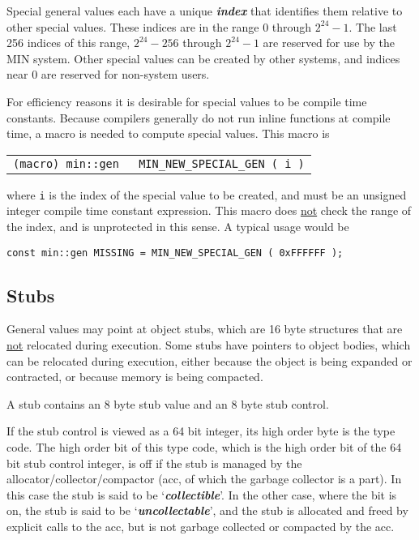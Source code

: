 \documentclass[12pt]{article}
\makeatletter
\newcommand{\key}[1]{{\bf \em #1}\index{#1}}
\newcommand{\ikey}[2]{{\bf \em #1}\index{#2}}
\newcommand{\ttnbkey}[1]{{\tt #1}\index{#1@{\tt #1}}}
\newenvironment{indpar}[1][0.3in]%
	{\begin{list}{}%
		     {\setlength{\itemsep}{0in}%
		      \setlength{\topsep}{0in}%
		      \setlength{\parsep}{1ex}%
		      \setlength{\labelwidth}{#1}%
		      \setlength{\leftmargin}{#1}%
		      \addtolength{\leftmargin}{\labelsep}}%
	 \item}%
	{\end{list}}
\newcommand{\LABEL}[1]{\label{#1}}
\newcommand{\TTNBKEY}[1]{\ttnbkey{#1}}
\makeatother
\begin{document}
Special general values each have a unique \ikey{index}{of special value}
that identifies them relative to other special values.  These
indices are in the range $0$ through $2^{24}-1$.  The last 256 indices of this
range, $2^{24}-256$ through $2^{24}-1$ are reserved for use by the MIN
system.  Other special values can be created by other systems,
and indices near 0 are reserved for non-system users.

For efficiency reasons it is desirable for special values to be
compile time constants.  Because compilers generally do not run
inline functions at compile time, a macro is needed to compute special
values.  This macro is

\begin{indpar}\begin{tabular}{r@{}l}
\verb|(macro) min::gen |
	& \TTNBKEY{MIN\_NEW\_SPECIAL\_GEN}\verb| ( i )|
\LABEL{MIN_NEW_SPECIAL_GEN} \\
\end{tabular}\end{indpar}

where \verb|i| is the index of the special value to be
created, and must be an unsigned integer compile time constant
expression.  This macro does \underline{not} check the range
of the index, and is unprotected in this sense.  A typical usage
would be

\begin{indpar}\begin{verbatim}
const min::gen MISSING = MIN_NEW_SPECIAL_GEN ( 0xFFFFFF );
\end{verbatim}\end{indpar}


\subsection{Stubs}
\label{STUBS}

General values may point at object stubs, which are 16 byte structures
that are \underline{not} relocated during execution.
Some stubs have pointers to object bodies, which can be
relocated during execution, either
because the object is being expanded or contracted, or because
memory is being compacted.

A stub contains an 8 byte stub value and an 8 byte stub control.

If the stub control is viewed as a 64 bit integer, its high order byte
is the type code.  The high order bit of this type code,
which is the high order
bit of the 64 bit stub control integer, is off if the stub is managed by
the allocator/collector/compactor (acc, of which the garbage collector is
a part).  In this case the stub is said to be `\key{collectible}'.
In the other case, where the bit is on, the stub is
said to be `\key{uncollectable}', and the stub is allocated and freed
by explicit calls to the acc, but is not garbage collected or compacted by the
acc.
\end{document}
